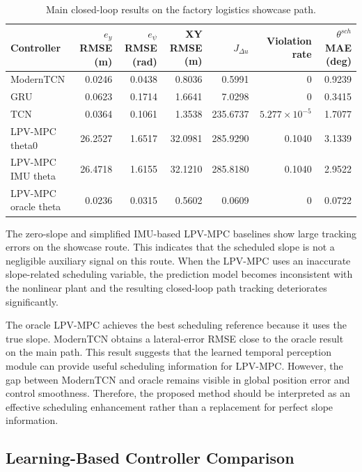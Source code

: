 \documentclass{ieeeaccess}
\begin{document}
\begin{table}[!t]
\centering
\caption{Main closed-loop results on the factory logistics showcase path.}
\label{tab:main_closed_loop}
\footnotesize
\begin{tabular}{lrrrrrr}
\hline
Controller & $e_y$ RMSE (m) & $e_{\psi}$ RMSE (rad) & XY RMSE (m) & $J_{\Delta u}$ & Violation rate & $\theta^{sch}$ MAE (deg) \\
\hline
ModernTCN & 0.0246 & 0.0438 & 0.8036 & 0.5991 & 0 & 0.9239 \\
GRU & 0.0623 & 0.1714 & 1.6641 & 7.0298 & 0 & 0.3415 \\
TCN & 0.0364 & 0.1061 & 1.3538 & 235.6737 & $5.277\times10^{-5}$ & 1.7077 \\
LPV-MPC theta0 & 26.2527 & 1.6517 & 32.0981 & 285.9290 & 0.1040 & 3.1339 \\
LPV-MPC IMU theta & 26.4718 & 1.6155 & 32.1210 & 285.8180 & 0.1040 & 2.9522 \\
LPV-MPC oracle theta & 0.0236 & 0.0315 & 0.5602 & 0.0609 & 0 & 0.0722 \\
\hline
\end{tabular}
\end{table}



The zero-slope and simplified IMU-based LPV-MPC baselines show large tracking errors on the showcase route. This indicates that the scheduled slope is not a negligible auxiliary signal on this route. When the LPV-MPC uses an inaccurate slope-related scheduling variable, the prediction model becomes inconsistent with the nonlinear plant and the resulting closed-loop path tracking deteriorates significantly.



The oracle LPV-MPC achieves the best scheduling reference because it uses the true slope. ModernTCN obtains a lateral-error RMSE close to the oracle result on the main path. This result suggests that the learned temporal perception module can provide useful scheduling information for LPV-MPC. However, the gap between ModernTCN and oracle remains visible in global position error and control smoothness. Therefore, the proposed method should be interpreted as an effective scheduling enhancement rather than a replacement for perfect slope information.



\subsection{Learning-Based Controller Comparison}
\end{document}
